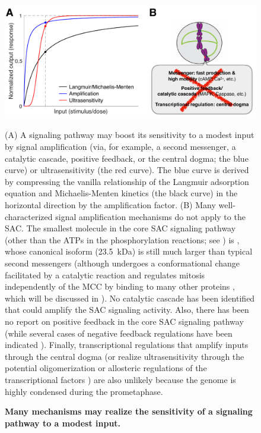 \begin{figure}
    \centering
    \includegraphics[width=\textwidth]{chapters/figures/SensitivityMechanisms.pdf}
    \caption{\textbf{Many mechanisms may realize the sensitivity of a signaling pathway to a modest input.}}
    \noindent\justifying 
    (A) A signaling pathway may boost its sensitivity to a modest input by signal amplification (via, for example, a second messenger, a catalytic cascade, positive feedback, or the central dogma; the blue curve) or ultrasensitivity (the red curve). The blue curve is derived by compressing the vanilla relationship of the Langmuir adsorption equation and Michaelis-Menten kinetics (the black curve) in the horizontal direction by the amplification factor. (B) Many well-characterized signal amplification mechanisms do not apply to the SAC. The smallest molecule in the core SAC signaling pathway (other than the ATPs in the phosphorylation reactions; see ) is , whose canonical isoform (\SI{23.5}{kDa}) is still much larger than typical second messengers (although  undergoes a conformational change facilitated by a catalytic reaction and regulates mitosis independently of the MCC by binding to many other proteins \cite{Separase-SGO2-MAD2, KIF20A-MAD2}, which will be discussed in ). No catalytic cascade has been identified that could amplify the SAC signaling activity. Also, there has been no report on positive feedback in the core SAC signaling pathway (while several cases of negative feedback regulations have been indicated \cite{Mps1pAutophosphorylation, PP2ADephosphorylatesBUB1, PP2ADephosphorylatesKNL1, PP2A-B56}). Finally, transcriptional regulations that amplify inputs through the central dogma (or realize ultrasensitivity through the potential oligomerization or allosteric regulations of the transcriptional factors \cite{TFMultimerization, TFAllostericRegulation}) are also unlikely because the genome is highly condensed during the prometaphase.
    \label{SensitivityMechanisms}
\end{figure}

